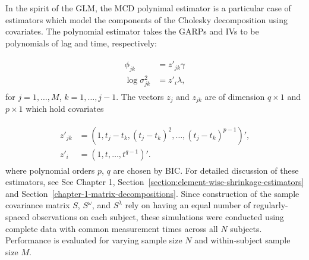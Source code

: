 In the spirit of the GLM, the MCD polynimal estimator is a particular case of estimators which model the components of the Cholesky decomposition using covariates. The polynomial estimator takes the GARPs and IVs to be polynomials of lag and time, respectively:

\begin{align*}
\begin{split}  \label{eq:GARP-IV-parametric-model}
\phi_{jk} &= z'_{jk} \gamma \\
\log \sigma^2_{jk} &= z'_{i}\lambda, 
\end{split}
\end{align*}
\noindent
for $j = 1,\dots, M$, $k = 1,\dots, j-1$. The vectors $z_j$ and $z_{jk}$ are of dimension $q \times 1$ and $p \times 1$  which hold covariates

\begin{align*}
\begin{split} 
z'_{jk} &= \left(1, t_j - t_k, \left(t_j - t_k\right)^2,\dots, \left(t_j - t_k\right)^{p-1}\right)', \\
z'_{i}  &= \left(1, t, \dots, t^{q-1}\right)'.
\end{split}
\end{align*}
\noindent
where polynomial orders $p$, $q$ are chosen by BIC.  For detailed discussion of these estimators, see See Chapter 1, Section~\ref{section:element-wise-shrinkage-estimators} and Section~\ref{chapter-1-matrix-decompositions}.  Since construction of the sample covariance matrix $S$, $S^\omega$, and $S^\lambda$ rely on having an equal number of regularly-spaced observations on each subject, these simulations were conducted using complete data with common measurement times across all $N$ subjects. Performance is evaluated for varying sample size $N$ and within-subject sample size $M$.


